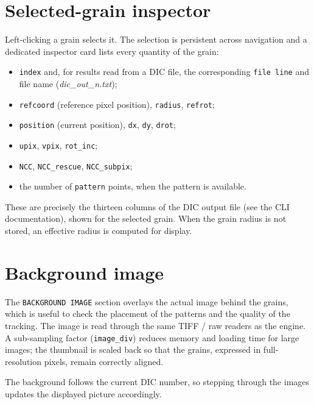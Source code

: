 \documentclass{simpledoc}
\newcommand{\file}[1]{\textit{\color{myblue}#1}}
\newcommand{\scr}[1]{\texttt{\color{myblue}#1}}
\newcommand{\key}[1]{\fbox{\color{myblue}#1}}
\begin{document}
\section{Selected-grain inspector}
\label{sec:inspector}

Left-clicking a grain selects it. The selection is persistent across navigation and a dedicated
inspector card lists every quantity of the grain:

\begin{itemize}
  \item \scr{index} and, for results read from a DIC file, the corresponding \scr{file line} and file
        name (\file{dic\_out\_\textit{n}.txt});
  \item \scr{refcoord} (reference pixel position), \scr{radius}, \scr{refrot};
  \item \scr{position} (current position), \scr{dx}, \scr{dy}, \scr{drot};
  \item \scr{upix}, \scr{vpix}, \scr{rot\_inc};
  \item \scr{NCC}, \scr{NCC\_rescue}, \scr{NCC\_subpix};
  \item the number of \scr{pattern} points, when the pattern is available.
\end{itemize}

These are precisely the thirteen columns of the DIC output file (see the CLI documentation), shown for
the selected grain. When the grain radius is not stored, an effective radius is computed for display.

\section{Background image}

\marginlabel{\key{B} \scr{Show / Hide image}}
The \scr{BACKGROUND IMAGE} section overlays the actual image behind the grains, which is useful to
check the placement of the patterns and the quality of the tracking. The image is read through the
same TIFF / raw readers as the engine. A sub-sampling factor (\scr{image\_div}) reduces memory and
loading time for large images; the thumbnail is scaled back so that the grains, expressed in
full-resolution pixels, remain correctly aligned.

\attention The background follows the current DIC number, so stepping through the images updates the
displayed picture accordingly.
\end{document}
